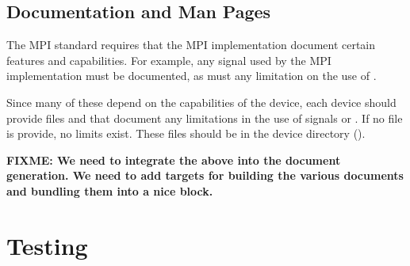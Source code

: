 \documentclass{article}
\def\fixme#1{\marginpar{FIXME:}\textbf{FIXME: #1}}
\begin{document}
\subsection{Documentation and Man Pages}
The MPI standard requires that the MPI implementation document certain
features and capabilities.  For example, any signal used by the MPI
implementation must be documented, as must any limitation on the use of
.  

Since many of these depend on the capabilities of the device, each device
should provide files  and  that
document any limitations in the use of signals or .  If
no file is provide, no limits exist.  These files should be in the device
directory ().

\fixme{We need to integrate the above into the document generation.
  We need to add targets for building the various documents and
  bundling them into a nice block.}

\section{Testing}
\label{sec:testing}
\end{document}

